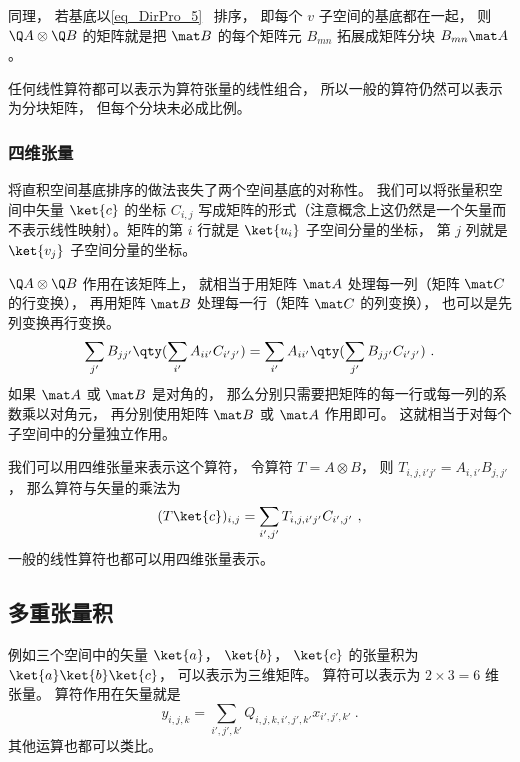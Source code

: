 同理， 若基底以\autoref{eq_DirPro_5}~ 排序， 即每个 $v$ 子空间的基底都在一起， 则  $\Q A \otimes \Q B$ 的矩阵就是把 $\mat B$ 的每个矩阵元 $B_{mn}$ 拓展成矩阵分块 $B_{mn} \mat A$。 

任何线性算符都可以表示为算符张量的线性组合， 所以一般的算符仍然可以表示为分块矩阵， 但每个分块未必成比例。

\subsubsection{四维张量}
将直积空间基底排序的做法丧失了两个空间基底的对称性。 我们可以将张量积空间中矢量 $\ket{c}$ 的坐标 $C_{i,j}$ 写成矩阵的形式（注意概念上这仍然是一个矢量而不表示线性映射）。矩阵的第 $i$ 行就是 $\ket{u_i}$ 子空间分量的坐标， 第 $j$ 列就是 $\ket{v_j}$ 子空间分量的坐标。

$\Q A \otimes \Q B$ 作用在该矩阵上， 就相当于用矩阵 $\mat A$ 处理每一列（矩阵 $\mat C$ 的行变换）， 再用矩阵 $\mat B$ 处理每一行（矩阵 $\mat C$ 的列变换）， 也可以是先列变换再行变换。
\begin{equation}
\sum_{j'} B_{jj'} \qty(\sum_{i'} A_{ii'} C_{i'j'})
= \sum_{i'} A_{ii'} \qty(\sum_{j'}B_{jj'} C_{i'j'})~.
\end{equation}
如果 $\mat A$ 或 $\mat B$ 是对角的， 那么分别只需要把矩阵的每一行或每一列的系数乘以对角元， 再分别使用矩阵 $\mat B$ 或 $\mat A$ 作用即可。 这就相当于对每个子空间中的分量独立作用。

我们可以用四维张量来表示这个算符， 令算符 $T = A\otimes B$， 则 $T_{i,j,i'j'} = A_{i,i'} B_{j, j'}$， 那么算符与矢量的乘法为
\begin{equation}
(T \ket{c})_{i,j} = \sum_{i',j'} T_{i,j,i'j'} C_{i',j'}~,
\end{equation}
一般的线性算符也都可以用四维张量表示。

\subsection{多重张量积}
例如三个空间中的矢量 $\ket{a}$， $\ket{b}$， $\ket{c}$ 的张量积为 $\ket{a}\ket{b}\ket{c}$， 可以表示为三维矩阵。 算符可以表示为 $2\times3 = 6$ 维张量。 算符作用在矢量就是
\begin{equation}
y_{i,j,k} = \sum_{i',j',k'} Q_{i,j,k,i',j',k'} x_{i',j',k'}~.
\end{equation}
其他运算也都可以类比。

